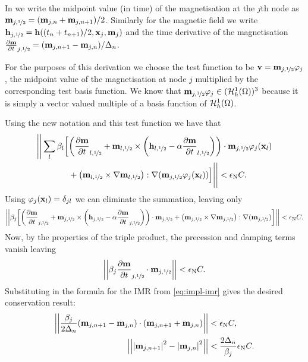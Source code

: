 \newcommand{\mvmp}[1][j]{\mv_{{#1},\half}}
\newcommand{\hvmp}[1][j]{\hv_{{#1},\half}}
\newcommand{\dmmp}[1][j]{\dmdt_{{#1},\half}}

In  we write the midpoint value (in time) of the magnetisation at the $j$th node as $ \mvmp = (\mv_{j,n} + \mv_{j,n+1})/2$.
Similarly for the magnetic field we write $\hvmp = \hv((t_n+t_{n+1})/2, \xv_j, \mv_j)$ and the time derivative of the magnetisation $\dmmp = (\mv_{j,n+1} - \mv_{j,n})/\dtn$.

For the purposes of this derivation we choose the test function to be $\testv = \mvmp \tbf_j$, \ie the midpoint value of the magnetisation at node $j$ multiplied by the corresponding test basis function.
We know that $\mvmp\tbf_j \in  (\ts)^3$ because it is simply a vector valued multiple of a basis function of ${\mathcal{H}^1_h(\Omega)}$.

Using the new notation and this test function we have that
\begin{equation}
  \begin{aligned}
    \Bigg|\Bigg| \sum_l \beta_l \bigg[& \bigb{\dmmp[l] + \mvmp[l] \times \bigb{\hvmp[l] - \dampc \dmmp[l]}} \cdot \mvmp\tbf_j(\xv_l) \\
    &+ \bigb{\mvmp[l] \times \grad \mvmp[l]} : \grad (\mvmp \tbf_j(\xv_l)) \Big] \Bigg|\Bigg| < \ntol \sumbasiscoeff.
  \end{aligned}
\end{equation}
Using $\varphi_j(\boldsymbol{\mathrm{x}}_l) = \delta_{jl}$ we can eliminate the summation, leaving only
\begin{equation}
  \begin{aligned}
    \norm{\beta_j \bigg[ \bigb{\dmmp  + \mvmp \times \bigb{\hvmp  - \dampc \dmmp}} \cdot \mvmp
    + \bigb{\mvmp \times \grad \mvmp} : \grad (\mvmp)
    \bigg] } < \ntol \sumbasiscoeff.
  \end{aligned}
\end{equation}
Now, by the properties of the triple product, the precession and damping terms vanish leaving
\begin{equation}
  \norm{\beta_j \dmmp \cdot  \mvmp } < \ntol \sumbasiscoeff.
\end{equation}
Substituting in the formula for the IMR from \cref{eq:impl-imr} gives the desired conservation result:
\begin{equation}
  \begin{aligned}
    \left| \left| \frac{\beta_j}{2\Delta_{n}}(\boldsymbol{\mathrm{m}}_{j,n+1} - \boldsymbol{\mathrm{m}}_{j,n}) \cdot (\boldsymbol{\mathrm{m}}_{j, n+1} + \boldsymbol{\mathrm{m}}_{j, n}) \right| \right| &< \epsilon_{\mathrm{N}} C, \\
    \left| \left| \left|{\boldsymbol{\mathrm{m}}_{j, n+1}} \right|^2 - \left|{\boldsymbol{\mathrm{m}}_{j, n}} \right|^2 \right| \right| &< \frac{2\Delta_{n}}{\beta_j} \epsilon_{\mathrm{N}} C.
  \end{aligned}
\end{equation}


